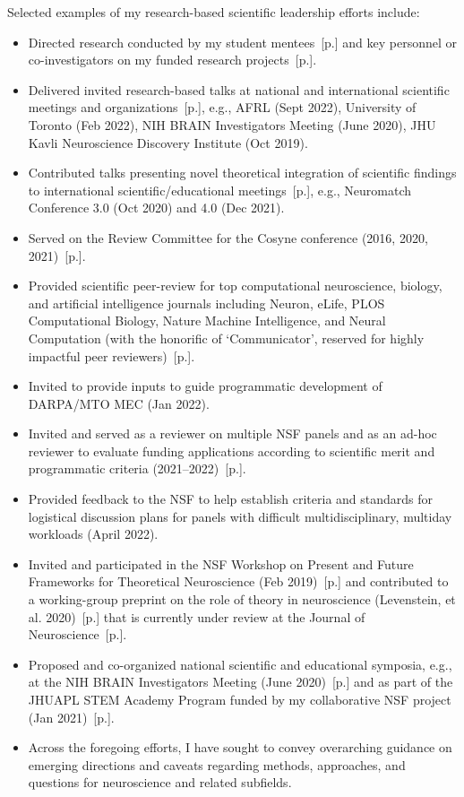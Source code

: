 \documentclass[10pt]{article}
\newcommand{\see}[1]{[\textcolor{hopkinsblue}{p.\pageref{sec:#1}}]}
\begin{document}
Selected examples of my research-based scientific leadership efforts include:
%
\begin{itemize}
  \item Directed research conducted by my student mentees~\see{mentoring}
    and key personnel or co-investigators on my funded research
    projects~\see{resprogram}.
  \item Delivered invited research-based talks at national and international
    scientific meetings and organizations~\see{natltalks}, e.g., AFRL (Sept 2022),
    University of Toronto (Feb 2022), NIH BRAIN Investigators Meeting (June 2020),
    JHU Kavli Neuroscience Discovery Institute (Oct 2019).
  \item Contributed talks presenting novel theoretical integration of scientific
    findings to international scientific/educational meetings~\see{intltalks}, e.g.,
    Neuromatch Conference 3.0 (Oct 2020) and 4.0 (Dec 2021).
  \item Served on the Review Committee for the Cosyne conference (2016, 2020,
    2021)~\see{confsvc}.
  \item Provided scientific peer-review for top computational neuroscience,
    biology, and artificial intelligence journals including Neuron, eLife, PLOS
    Computational Biology, Nature Machine Intelligence, and Neural Computation
    (with the honorific of `Communicator', reserved for highly impactful peer
    reviewers)~\see{service}.
  \item Invited to provide inputs to guide programmatic development of DARPA/MTO
    MEC (Jan 2022).
  \item Invited and served as a reviewer on multiple NSF panels and as an ad-hoc
    reviewer to evaluate funding applications according to scientific merit and
    programmatic criteria (2021--2022)~\see{programsvc}.
  \item Provided feedback to the NSF to help establish criteria and standards
    for logistical discussion plans for panels with difficult multidisciplinary,
    multiday workloads (April 2022).
  \item Invited and participated in the NSF Workshop on Present and Future
    Frameworks for Theoretical Neuroscience (Feb 2019)~\see{natltalks} and
    contributed to a working-group preprint on the role of theory in neuroscience
    (Levenstein, et al. 2020)~\see{preprints} that is currently under review at
    the Journal of Neuroscience~\see{pubs}.
  \item Proposed and co-organized national scientific and educational symposia,
    e.g., at the NIH BRAIN Investigators Meeting (June 2020)~\see{natltalks} and
    as part of the JHUAPL STEM Academy Program funded by my collaborative NSF
    project (Jan 2021)~\see{eduprogram}.
  \item Across the foregoing efforts, I have sought to convey overarching
    guidance on emerging directions and caveats regarding methods, approaches, and
    questions for neuroscience and related subfields.
\end{itemize}
\end{document}

